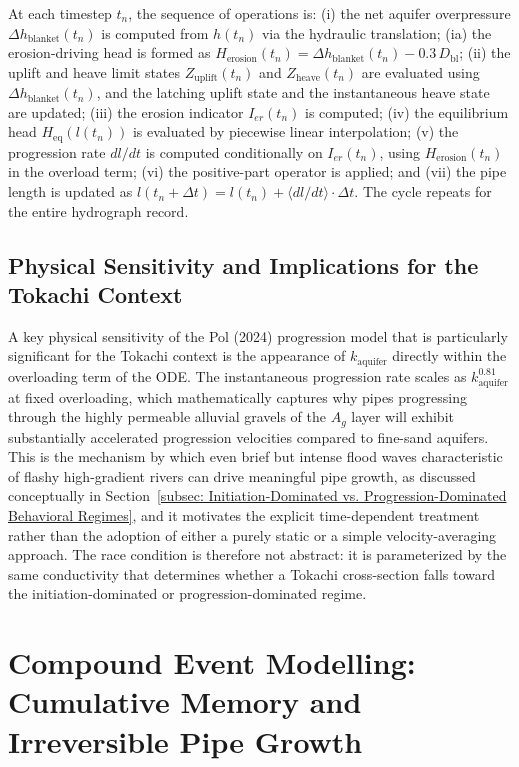 At each timestep $t_n$, the sequence of operations is: (i) the net aquifer overpressure $\Delta h_\mathrm{blanket}(t_n)$ is computed from $h(t_n)$ via the hydraulic translation; (ia) the erosion-driving head is formed as $H_\mathrm{erosion}(t_n) = \Delta h_\mathrm{blanket}(t_n) - 0.3\,D_\mathrm{bl}$; (ii) the uplift and heave limit states $Z_\mathrm{uplift}(t_n)$ and $Z_\mathrm{heave}(t_n)$ are evaluated using $\Delta h_\mathrm{blanket}(t_n)$, and the latching uplift state and the instantaneous heave state are updated; (iii) the erosion indicator $I_{er}(t_n)$ is computed; (iv) the equilibrium head $H_\mathrm{eq}(l(t_n))$ is evaluated by piecewise linear interpolation; (v) the progression rate $dl/dt$ is computed conditionally on $I_{er}(t_n)$, using $H_\mathrm{erosion}(t_n)$ in the overload term; (vi) the positive-part operator is applied; and (vii) the pipe length is updated as $l(t_n + \Delta t) = l(t_n) + \langle dl/dt\rangle \cdot \Delta t$. The cycle repeats for the entire hydrograph record.

\subsection{Physical Sensitivity and Implications for the Tokachi Context}
\label{subsec: Physical Sensitivity and Implications for the Tokachi Context}

A key physical sensitivity of the Pol (2024) progression model that is particularly significant for the Tokachi context is the appearance of $k_\mathrm{aquifer}$ directly within the overloading term of the ODE. The instantaneous progression rate scales as $k_\mathrm{aquifer}^{0.81}$ at fixed overloading, which mathematically captures why pipes progressing through the highly permeable alluvial gravels of the $A_g$ layer will exhibit substantially accelerated progression velocities compared to fine-sand aquifers. This is the mechanism by which even brief but intense flood waves characteristic of flashy high-gradient rivers can drive meaningful pipe growth, as discussed conceptually in Section~\ref{subsec: Initiation-Dominated vs. Progression-Dominated Behavioral Regimes}, and it motivates the explicit time-dependent treatment rather than the adoption of either a purely static or a simple velocity-averaging approach. The race condition is therefore not abstract: it is parameterized by the same conductivity that determines whether a Tokachi cross-section falls toward the initiation-dominated or progression-dominated regime.

\section{Compound Event Modelling: Cumulative Memory and Irreversible Pipe Growth}
\label{sec: Compound Event Modelling: Cumulative Memory and Irreversible Pipe Growth}

